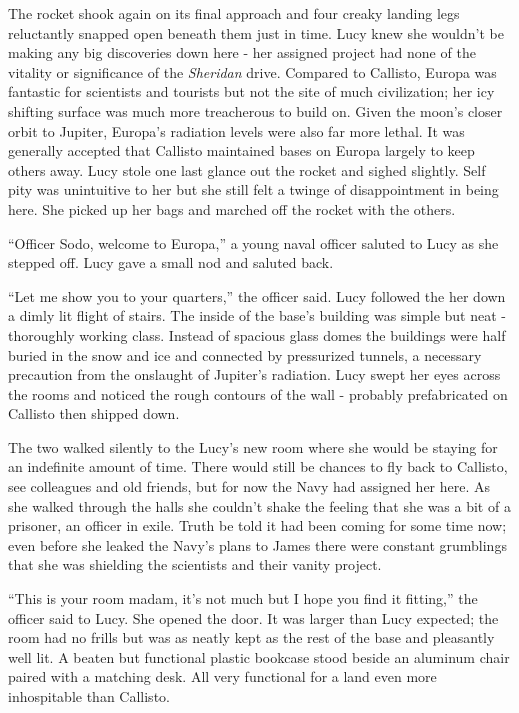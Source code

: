 \documentclass[12pt]{article} %
\begin{document}
The rocket shook again on its final approach and four creaky landing legs reluctantly snapped open beneath them just in time. Lucy knew she wouldn't be making any big discoveries down here - her assigned project had none of the vitality or significance of the \textit{Sheridan}  drive. Compared to Callisto, Europa was fantastic for scientists and tourists but not the site of much civilization; her icy shifting surface was much more treacherous to build on. Given the moon's closer orbit to Jupiter, Europa's radiation levels were also far more lethal. It was generally accepted that Callisto maintained bases on Europa largely to keep others away. Lucy stole one last glance out the rocket and sighed slightly. Self pity was unintuitive to her but she still felt a twinge of disappointment in being here. She picked up her bags and marched off the rocket with the others.

``Officer Sodo, welcome to Europa,'' a young naval officer saluted to Lucy as she stepped off. Lucy gave a small nod and saluted back.

 ``Let me show you to your quarters,'' the officer said. Lucy followed the her down a dimly lit flight of stairs. The inside of the base's building was simple but neat - thoroughly working class. Instead of spacious glass domes the buildings were half buried in the snow and ice and connected by pressurized tunnels, a necessary precaution from the onslaught of Jupiter's radiation. Lucy swept her eyes across the rooms and noticed the rough contours of the wall - probably prefabricated on Callisto then shipped down.

The two walked silently to the Lucy's new room where she would be staying for an indefinite amount of time. There would still be chances to fly back to Callisto, see colleagues and old friends, but for now the Navy had assigned her here. As she walked through the halls she couldn't shake the feeling that she was a bit of a prisoner, an officer in exile. Truth be told it had been coming for some time now; even before she leaked the Navy's plans to James there were constant grumblings that she was shielding the scientists and their vanity project.

``This is your room madam, it's not much but I hope you find it fitting,'' the officer said to Lucy. She opened the door. It was larger than Lucy expected; the room had no frills but was as neatly kept as the rest of the base and pleasantly well lit. A beaten but functional plastic bookcase stood beside an aluminum chair paired with a matching desk. All very functional for a land even more inhospitable than Callisto.
\end{document}
